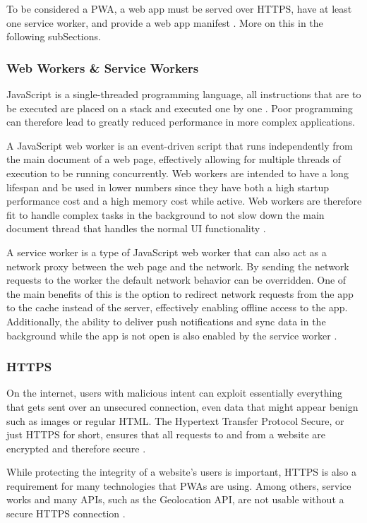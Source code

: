 \documentclass[a4paper,12pt]{article}
\begin{document}
To be considered a PWA, a web app must be served over HTTPS, have at least one service worker, and provide a web app manifest \cite{serviceworker_efficiency}. More on this in the following subSections.

\subsubsection{Web Workers \& Service Workers}
JavaScript is a single-threaded programming language, all instructions that are to be executed are placed on a stack and executed one by one \cite{mozilla_js}. Poor programming can therefore lead to greatly reduced performance in more complex applications.

A JavaScript web worker is an event-driven script that runs independently from the main document of a web page, effectively allowing for multiple threads of execution to be running concurrently. Web workers are intended to have a long lifespan and be used in lower numbers since they have both a high startup performance cost and a high memory cost while active. Web workers are therefore fit to handle complex tasks in the background to not slow down the main document thread that handles the normal UI functionality \cite{workers_html_spec}.

A service worker is a type of JavaScript web worker that can also act as a network proxy between the web page and the network. By sending the network requests to the worker the default network behavior can be overridden. One of the main benefits of this is the option to redirect network requests from the app to the cache instead of the server, effectively enabling offline access to the app. Additionally, the ability to deliver push notifications and sync data in the background while the app is not open is also enabled by the service worker \cite{service_workers_spec}.

\subsubsection{HTTPS}
On the internet, users with malicious intent can exploit essentially everything that gets sent over an unsecured connection, even data that might appear benign such as images or regular HTML. The Hypertext Transfer Protocol Secure, or just HTTPS for short, ensures that all requests to and from a website are encrypted and therefore secure \cite{why_https_matters}. 

While protecting the integrity of a website’s users is important, HTTPS is also a requirement for many technologies that PWAs are using. Among others, service works and many APIs, such as the Geolocation API, are not usable without a secure HTTPS connection \cite{why_https_matters}.
\end{document}
